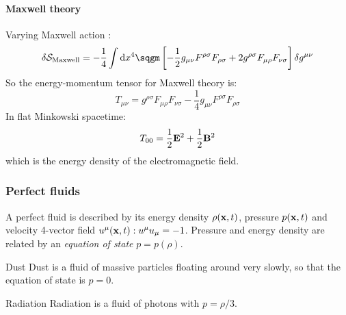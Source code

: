 \paragraph{Maxwell theory}

Varying Maxwell action :
\begin{equation*}
  \delta \mathcal{S}_{\text{Maxwell}} = - \frac{1}{4} \int \dd x^4 \sqgm \left[ - \frac{1}{2} g_{\mu \nu} F^{\rho \sigma} F_{\rho \sigma} + 2 g^{\rho \sigma} F_{\mu \rho} F_{\nu \sigma} \right] \delta g^{\mu \nu}
\end{equation*}
So the energy-momentum tensor for Maxwell theory is:
\begin{equation}
  T_{\mu \nu} = g^{\rho \sigma} F_{\mu \rho} F_{\nu \sigma} - \frac{1}{4} g_{\mu \nu} F^{\rho \sigma} F_{\rho \sigma}
\end{equation}
In flat Minkowski spacetime:
\begin{equation*}
  T_{00} = \frac{1}{2} \mathbf{E}^2 + \frac{1}{2} \mathbf{B}^2
\end{equation*}
which is the energy density of the electromagnetic field.

\subsubsection{Perfect fluids}

A perfect fluid is described by its energy density $ \rho(\mathbf{x},t) $, pressure $ p(\mathbf{x},t) $ and velocity 4-vector field $ u^\mu(\mathbf{x},t) : u^\mu u_\mu = -1 $. Pressure and energy density are related by an \textit{equation of state} $ p = p(\rho) $.

\begin{example}{Dust}{}
  Dust is a fluid of massive particles floating around very slowly, so that the equation of state is $ p = 0 $.
\end{example}
\begin{example}{Radiation}{}
  Radiation is a fluid of photons with $ p = \rho / 3 $.
\end{example}

